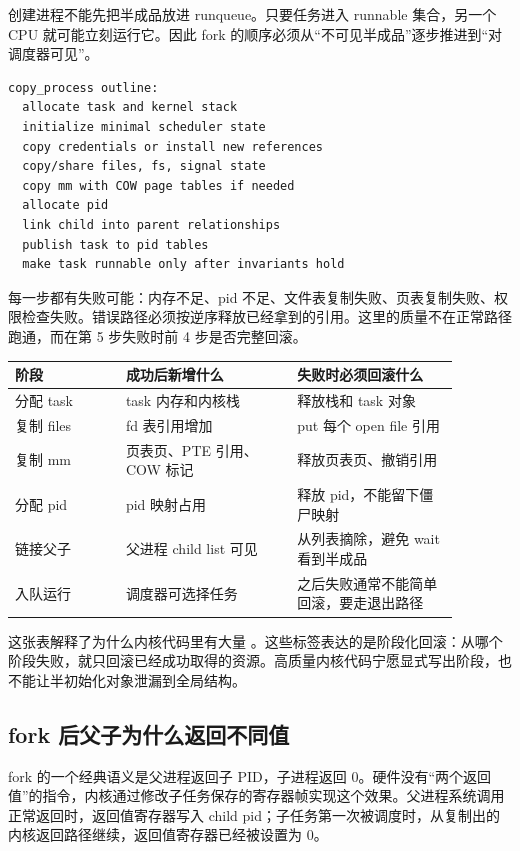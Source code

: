 创建进程不能先把半成品放进 runqueue。只要任务进入 runnable 集合，另一个 CPU 就可能立刻运行它。因此 fork 的顺序必须从“不可见半成品”逐步推进到“对调度器可见”。

\begin{lstlisting}
copy_process outline:
  allocate task and kernel stack
  initialize minimal scheduler state
  copy credentials or install new references
  copy/share files, fs, signal state
  copy mm with COW page tables if needed
  allocate pid
  link child into parent relationships
  publish task to pid tables
  make task runnable only after invariants hold
\end{lstlisting}

每一步都有失败可能：内存不足、pid 不足、文件表复制失败、页表复制失败、权限检查失败。错误路径必须按逆序释放已经拿到的引用。这里的质量不在正常路径跑通，而在第 5 步失败时前 4 步是否完整回滚。

\begin{longtable}{|p{0.22\linewidth}|p{0.34\linewidth}|p{0.32\linewidth}|}
\toprule
阶段 & 成功后新增什么 & 失败时必须回滚什么 \\
\midrule
分配 task & task 内存和内核栈 & 释放栈和 task 对象 \\\tablerowrule
复制 files & fd 表引用增加 & put 每个 open file 引用 \\\tablerowrule
复制 mm & 页表页、PTE 引用、COW 标记 & 释放页表页、撤销引用 \\\tablerowrule
分配 pid & pid 映射占用 & 释放 pid，不能留下僵尸映射 \\\tablerowrule
链接父子 & 父进程 child list 可见 & 从列表摘除，避免 wait 看到半成品 \\\tablerowrule
入队运行 & 调度器可选择任务 & 之后失败通常不能简单回滚，要走退出路径 \\
\bottomrule
\end{longtable}

这张表解释了为什么内核代码里有大量 。这些标签表达的是阶段化回滚：从哪个阶段失败，就只回滚已经成功取得的资源。高质量内核代码宁愿显式写出阶段，也不能让半初始化对象泄漏到全局结构。

\subsection{fork 后父子为什么返回不同值}

fork 的一个经典语义是父进程返回子 PID，子进程返回 0。硬件没有“两个返回值”的指令，内核通过修改子任务保存的寄存器帧实现这个效果。父进程系统调用正常返回时，返回值寄存器写入 child pid；子任务第一次被调度时，从复制出的内核返回路径继续，返回值寄存器已经被设置为 0。


